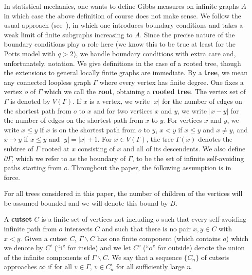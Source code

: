 In statistical mechanics, one wants to define Gibbs measures on infinite
graphs $A$ in which case the above definition of course does not make sense.
We follow the usual approach (see~\cite{Ge}), in which one introduces
boundary conditions and takes a weak limit of finite subgraphs
increasing to $A$.  Since the precise nature of the boundary conditions 
play a role here (we know this to be true at least for the Potts model 
with $q > 2$), we handle boundary conditions with extra care and, 
unfortunately, notation.  We give definitions in the case of a rooted 
tree, though the extensions to general locally finite graphs are immediate.  
By a {\bf tree}, we mean any connected loopless graph $\Gamma$ where
every vertex has finite degree.  One fixes a vertex $o$ of $\Gamma$ 
which we call the {\bf root}, obtaining a {\bf rooted tree}.  
The vertex set of $\Gamma$ is denoted by $V(\Gamma)$.  If $x$ is a vertex,
we write $|x|$ for the number of edges on the shortest
path from $o$ to $x$ and for two vertices $x$ and $y$, we
write $|x-y|$ for the number of edges on the shortest
path from $x$ to $y$.  For vertices $x$ and $y$, we write $x \le y$ 
if $x$ is on the shortest path from $o$ to $y$, $x < y$
if $x \le y$ and $x \ne y$, and $x \to y$ if $x \le y$ and 
$|y|=|x|+1$.  For $x \in V(\Gamma)$, the tree $\Gamma (x)$ denotes
the subtree of $\Gamma$ rooted at $x$ consisting of $x$ and all of its
descendents. We also define $\partial\Gamma$, which we refer to as the
boundary of $\Gamma$, to be the set of infinite
self-avoiding paths starting from $o$.
Throughout the paper, the following assumption is in force.

 For all trees considered in this paper,
the number of children of the vertices will be assumed bounded
and we will denote this bound by $B$.

A {\bf cutset} $C$ is a finite set of vertices not including $o$ such that
every self-avoiding infinite path from $o$ intersects $C$ and such that there
is no pair $x , y \in C$ with $x < y$. Given a cutset $C$,
$\Gamma \backslash C$ has one finite component (which contains $o$)
which we denote by $C^i$ (``i'' for inside) and we let 
$C^o$ (``o'' for outside) denote the union of the infinite components
of $\Gamma \backslash C$. We say that a sequence
$\{ C_n \}$ of cutsets approaches $\infty$ if for all $v \in \Gamma$,
$v \in C_n^i$ for all sufficiently large $n$.  


